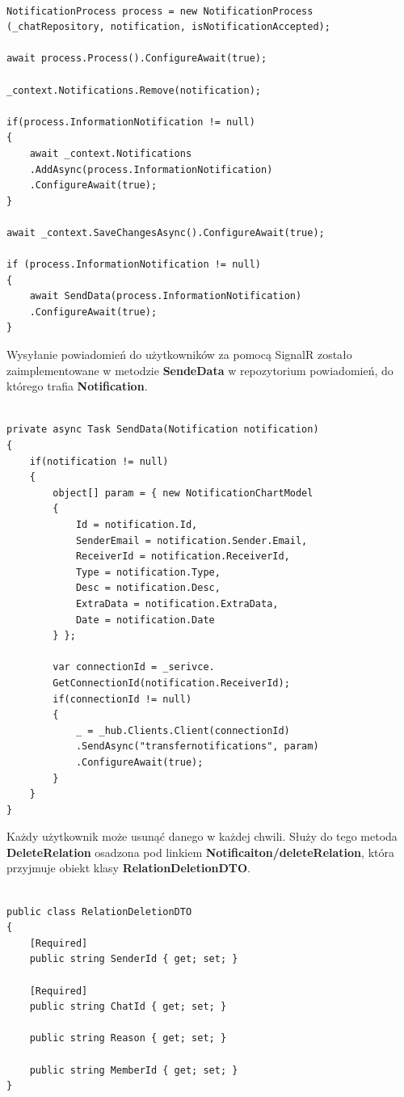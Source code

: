 \documentclass[12pt,a4paper]{article}
\begin{document}
\begin{lstlisting}[caption={Implementacja procesowania powiadomienia}]

NotificationProcess process = new NotificationProcess
(_chatRepository, notification, isNotificationAccepted);

await process.Process().ConfigureAwait(true);

_context.Notifications.Remove(notification);

if(process.InformationNotification != null)
{
	await _context.Notifications
	.AddAsync(process.InformationNotification)
	.ConfigureAwait(true);
}

await _context.SaveChangesAsync().ConfigureAwait(true);

if (process.InformationNotification != null)
{
	await SendData(process.InformationNotification)
	.ConfigureAwait(true);
} 
\end{lstlisting}

Wysyłanie powiadomień do użytkowników za pomocą SignalR zostało zaimplementowane w metodzie \textbf{SendeData} w repozytorium powiadomień, do którego trafia \textbf{Notification}.

\begin{lstlisting}[caption={Implementacja wysyłania powiadomień do użytkownika za pomocą SignalR}]

private async Task SendData(Notification notification)
{
	if(notification != null)
	{
		object[] param = { new NotificationChartModel
		{
			Id = notification.Id,
			SenderEmail = notification.Sender.Email,
			ReceiverId = notification.ReceiverId,
			Type = notification.Type,
			Desc = notification.Desc,
			ExtraData = notification.ExtraData,
			Date = notification.Date
		} };
	
		var connectionId = _serivce.
		GetConnectionId(notification.ReceiverId);
		if(connectionId != null)
		{
			_ = _hub.Clients.Client(connectionId)
			.SendAsync("transfernotifications", param)
			.ConfigureAwait(true);
		}
	}
}
\end{lstlisting}

Każdy użytkownik może usunąć danego w każdej chwili. Służy do tego metoda \textbf{DeleteRelation} osadzona pod linkiem \textbf{Notificaiton/deleteRelation}, która przyjmuje obiekt klasy \textbf{RelationDeletionDTO}.

\begin{lstlisting}[caption={Implementacja klasy RelationDeletionDTO}]

public class RelationDeletionDTO
{
	[Required]
	public string SenderId { get; set; }
	
	[Required]
	public string ChatId { get; set; }
	
	public string Reason { get; set; }
	
	public string MemberId { get; set; }
}
\end{lstlisting}
\end{document}
